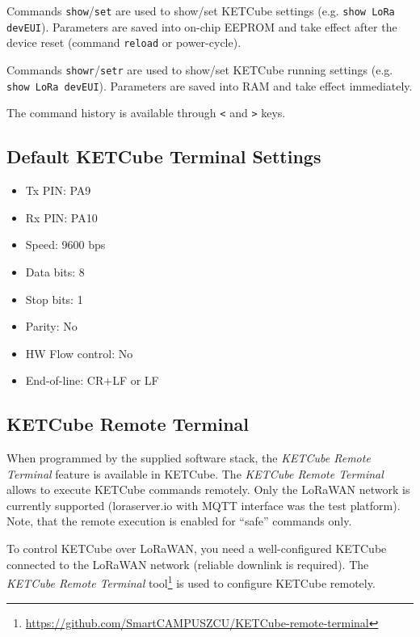 Commands {\tt show}/{\tt set} are used to show/set KETCube settings (e.g. {\tt show LoRa devEUI}). Parameters are saved into on-chip EEPROM and take effect after the device reset (command {\tt reload} or power-cycle).

Commands {\tt showr}/{\tt setr} are used to show/set KETCube running settings (e.g. {\tt show LoRa devEUI}). Parameters are saved into RAM and take effect immediately.

The command history is available through {\tt <} and {\tt >} keys.


\clearpage 

\subsection{Default KETCube Terminal Settings}

\begin{itemize}
  \item Tx PIN: PA9
  \item Rx PIN: PA10
  \item Speed: 9600 bps
  \item Data bits: 8
  \item Stop bits: 1
  \item Parity: No
  \item HW Flow control: No
  \item End-of-line: CR+LF or LF
\end{itemize}

\subsection{KETCube Remote Terminal}
When programmed by the supplied software stack, the {\it KETCube Remote Terminal} feature is available in KETCube. The {\it KETCube Remote Terminal} allows to execute KETCube commands remotely. Only the LoRaWAN network is currently supported (loraserver.io with MQTT interface was the test platform). Note, that the remote execution is enabled for ``safe'' commands only.

To control KETCube over LoRaWAN, you need a well-configured KETCube connected to the LoRaWAN network (reliable downlink is required). The {\it KETCube Remote Terminal} tool\footnote{\url{https://github.com/SmartCAMPUSZCU/KETCube-remote-terminal}} is used to configure KETCube remotely.

